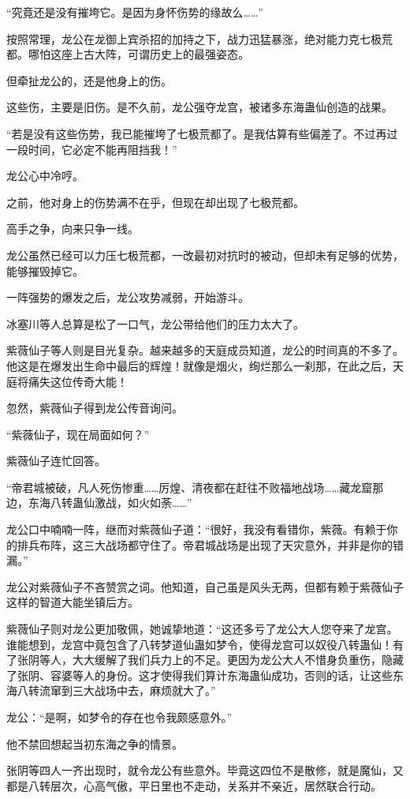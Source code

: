 \begin{this_body}
“究竟还是没有摧垮它。是因为身怀伤势的缘故么……”

按照常理，龙公在龙御上宾杀招的加持之下，战力迅猛暴涨，绝对能力克七极荒都。哪怕这座上古大阵，可谓历史上的最强姿态。

但牵扯龙公的，还是他身上的伤。

这些伤，主要是旧伤。是不久前，龙公强夺龙宫，被诸多东海蛊仙创造的战果。

“若是没有这些伤势，我已能摧垮了七极荒都了。是我估算有些偏差了。不过再过一段时间，它必定不能再阻挡我！”

龙公心中冷哼。

之前，他对身上的伤势满不在乎，但现在却出现了七极荒都。

高手之争，向来只争一线。

龙公虽然已经可以力压七极荒都，一改最初对抗时的被动，但却未有足够的优势，能够摧毁掉它。

一阵强势的爆发之后，龙公攻势减弱，开始游斗。

冰塞川等人总算是松了一口气，龙公带给他们的压力太大了。

紫薇仙子等人则是目光复杂。越来越多的天庭成员知道，龙公的时间真的不多了。他这是在爆发出生命中最后的辉煌！就像是烟火，绚烂那么一刹那，在此之后，天庭将痛失这位传奇大能！

忽然，紫薇仙子得到龙公传音询问。

“紫薇仙子，现在局面如何？”

紫薇仙子连忙回答。

“帝君城被破，凡人死伤惨重……厉煌、清夜都在赶往不败福地战场……藏龙窟那边，东海八转蛊仙激战，如火如荼……”

龙公口中喃喃一阵，继而对紫薇仙子道：“很好，我没有看错你，紫薇。有赖于你的排兵布阵，这三大战场都守住了。帝君城战场是出现了天灾意外，并非是你的错漏。”

龙公对紫薇仙子不吝赞赏之词。他知道，自己虽是风头无两，但都有赖于紫薇仙子这样的智道大能坐镇后方。

紫薇仙子则对龙公更加敬佩，她诚挚地道：“这还多亏了龙公大人您夺来了龙宫。谁能想到，龙宫中竟包含了八转梦道仙蛊如梦令，使得龙宫可以奴役八转蛊仙！有了张阴等人，大大缓解了我们兵力上的不足。更因为龙公大人不惜身负重伤，隐藏了张阴、容婆等人的身份。这才使得我们算计东海蛊仙成功，否则的话，让这些东海八转流窜到三大战场中去，麻烦就大了。”

龙公：“是啊，如梦令的存在也令我颇感意外。”

他不禁回想起当初东海之争的情景。

张阴等四人一齐出现时，就令龙公有些意外。毕竟这四位不是散修，就是魔仙，又都是八转层次，心高气傲，平日里也不走动，关系并不亲近，居然联合行动。


\end{this_body}
